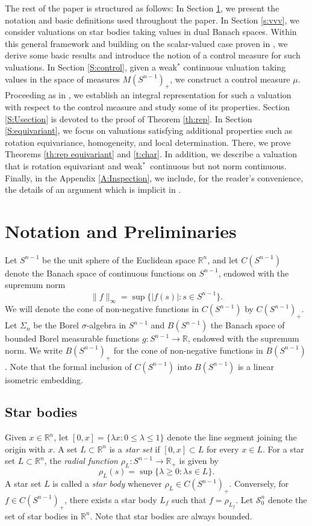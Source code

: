 \documentclass[11pt, a4paper]{amsart}
\newcommand{\rp}{\mathbb R_{\scriptscriptstyle +}}
\newcommand{\sn}{{S^{n-1}}}
\newcommand{\starn}{\mathcal S_{\scriptscriptstyle 0}^n}
\newcommand{\measn}{M(\sn )_{\scriptscriptstyle +}}
\newcommand{\cfn}{C(\sn )_{\scriptscriptstyle +}}
\newcommand{\bfn}{B(\sn )_{\scriptscriptstyle +}}
\newcommand{\R}{\mathbb R}
\newcommand{\rn}{\mathbb R^n}
\begin{document}
The rest of the paper is structured as follows: In Section \ref{sectionnotation}, we present the notation and basic definitions used throughout the paper. In Section \ref{s:vvv}, we consider valuations on star bodies taking values in dual Banach spaces. Within this general framework and building on the scalar-valued case proven in \cite{TrViIntRep}, we derive some basic results and introduce the notion of a control measure for such valuations. In Section \ref{S:control}, given a weak$^*$ continuous valuation taking values in the space of measures $\measn$, we construct a control measure $\mu$. Proceeding as in  \cite{TrViIntRep}, we establish an integral representation for such a valuation with respect to the control measure and study some of its properties. Section \ref{S:Usection} is devoted to the proof of Theorem \ref{th:rep}. In Section \ref{S:equivariant}, we focus on valuations satisfying additional properties such as rotation equivariance, homogeneity, and local determination. There, we prove Theorems \ref{th:rep equivariant} and \ref{t:char}. In addition, we describe a valuation that is rotation equivariant and weak$^*$~continuous but not norm continuous. Finally, in the Appendix \ref{A:Inspection}, we include, for the reader's convenience, the details of an argument which is implicit in \cite{TrViIntRep}.  



\section{Notation and Preliminaries}\label{sectionnotation}

Let $\sn$ be the unit sphere of the Euclidean space $\rn$, and let $C(\sn )$  denote the Banach space of continuous functions on $\sn$, endowed with the supremum norm 
$$\|f\|_{\scriptscriptstyle \infty}=\sup\{|f(s)|: {s\in \sn }\}.$$ 
We will denote the cone of non-negative functions in $C(\sn )$ by $\cfn$. Let $\Sigma_n$ be the Borel $\sigma$-algebra in $\sn $ and $B(\sn )$ the Banach space of bounded Borel measurable functions $g\colon\sn \to \R$, endowed with the supremum norm. We write $\bfn$ for the cone of non-negative functions in $B(\sn )$. Note that the formal inclusion of  $C(\sn )$ into $B(\sn )$ is a linear isometric embedding.  

\subsection{Star bodies}\label{ss:star} 
Given $x \in \rn$, let $[0,x]=\{\lambda x:0\leq \lambda\leq 1\}$ denote the line segment joining the origin with $x$. A set $L\subset \rn$ is a {\em star set} if $[0,x]\subset L$ for every $x\in L$. 
For a star set $L\subset \rn$, the {\em radial function} $\rho_L\colon\sn \to\rp$ is given by
$$
\rho_L(s)=  \sup \{\lambda\geq 0 : \lambda s\in L\}.
$$
A star set $L$ is called a {\em star body} whenever $\rho_L \in \cfn$. Conversely, for $f\in \cfn$, there exists a star body $L_f$ such that $f=\rho_{L_f}$.
Let $\starn$ denote the set of star bodies in $\rn$. Note that star bodies are always bounded. 
\end{document}
